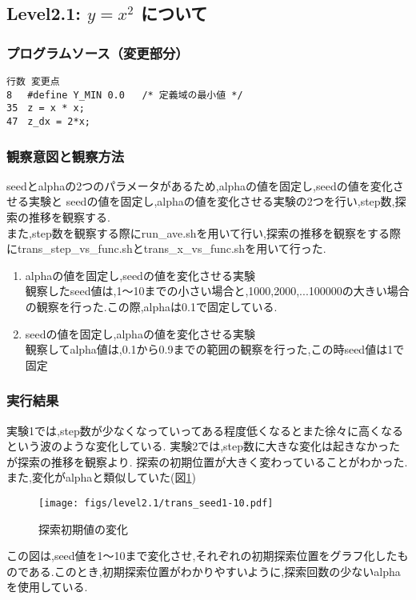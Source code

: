 \subsection{Level2.1: $y=x^2$ について}
\subsubsection{プログラムソース（変更部分）}
\begin{breakbox}
\begin{verbatim}
行数 変更点
8 　#define Y_MIN 0.0   /* 定義域の最小値 */
35　z = x * x;
47　z_dx = 2*x;
\end{verbatim}
\end{breakbox}

\subsubsection{観察意図と観察方法}
seedとalphaの2つのパラメータがあるため,alphaの値を固定し,seedの値を変化させる実験と
seedの値を固定し,alphaの値を変化させる実験の2つを行い,step数,探索の推移を観察する.\\
また,step数を観察する際にrun\_ave.shを用いて行い,探索の推移を観察をする際にtrans\_step\_vs\_func.shとtrans\_x\_vs\_func.shを用いて行った.\\

\begin{enumerate}
	\item  alphaの値を固定し,seedの値を変化させる実験\\
		観察したseed値は,1〜10までの小さい場合と,1000,2000,...100000の大きい場合の観察を行った.この際,alphaは0.1で固定している.
	\item seedの値を固定し,alphaの値を変化させる実験\\
		観察してalpha値は,0.1から0.9までの範囲の観察を行った,この時seed値は1で固定
\end{enumerate}

\subsubsection{実行結果}
実験1では,step数が少なくなっていってある程度低くなるとまた徐々に高くなるという波のような変化している.
実験2では,step数に大きな変化は起きなかったが探索の推移を観察より.
探索の初期位置が大きく変わっていることがわかった.
また,変化がalphaと類似していた(図\ref{trans_seed})

\begin{figure}[ht]
 \begin{center}
  \texttt{[image: figs/level2.1/trans\_seed1-10.pdf]}
  \caption{探索初期値の変化}
	\label{trans_seed}
 \end{center}
\end{figure}
この図は,seed値を1〜10まで変化させ,それぞれの初期探索位置をグラフ化したものである.このとき,初期探索位置がわかりやすいように,探索回数の少ないalphaを使用している.

